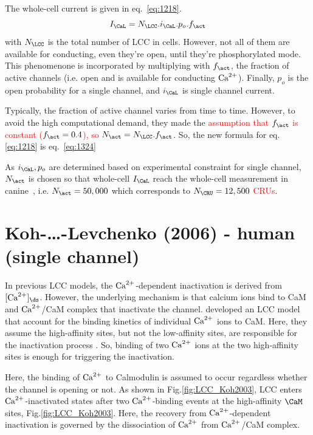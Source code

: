 The whole-cell current is given in eq.~\eqref{eq:1218}.
\begin{equation}
  \label{eq:1218}
  I_\CaL = N_\LCC . i_\CaL . p_o . f_\act
\end{equation}
with $N_\LCC$ is the total number of LCC in cells. However, not all of them are
available for conducting, even they're open, until they're phosphorylated
mode.
This phenomenone is incorporated by multiplying with $f_\act$, the fraction of
active channels (i.e. open and is available  for conducting ${\text{Ca}^{2+}}$). Finally,
$p_o$ is the open probability for a single channel, and $i_\CaL$ is single channel current.

Typically, the fraction of active channel varies from time to time. However, to
avoid the high computational demand, they made the \textcolor{red}{assumption
that $f_\act$ is constant ($f_\act=0.4$)\citep{handrock1998}, so
  $N_\act=N_\LCC.f_\act$}. So, the new formula for eq.\ref{eq:1218} is
eq.~\eqref{eq:1324}

As $i_\CaL,p_o$ are determined based on experimental constraint for single
channel, $N_\act$ is chosen so that whole-cell $I_\CaL$ reach the whole-cell
measurement in canine~\citep{hobai2001}, i.e. $N_\act=50,000$ which
corresponds to \textcolor{red}{$N_\CRU = 12,500$ CRUs}.





\section{Koh-\ldots-Levchenko (2006) - human (single channel)}
\label{sec:LCC_Koh2006}

In previous LCC models, the ${\text{Ca}^{2+}}$-dependent inactivation is derived from
$[\Ca]_\ds$. However, the underlying mechanism is that calcium ions bind to
CaM and ${\text{Ca}^{2+}}$/CaM complex that inactivate the channel. \citep{koh2006} developed
an LCC model that account for the binding kinetics of individual ${\text{Ca}^{2+}}$ ions to
CaM. Here, they assume the high-affinity sites, but not the low-affinity sites,
are responsible for the inactivation process \citep{peterson1999}. So, binding
of two ${\text{Ca}^{2+}}$ ions at the two high-affinity sites is enough for triggering the
inactivation.

Here, the binding of ${\text{Ca}^{2+}}$ to Calmodulin is assumed to occur regardless whether
the channel is opening or not. As shown in Fig.\ref{fig:LCC_Koh2003}, LCC enters
${\text{Ca}^{2+}}$-inactivated states after two ${\text{Ca}^{2+}}$-binding events at the high-affinity
$\CaM$ sites, Fig.\ref{fig:LCC_Koh2003}. Here, the recovery from ${\text{Ca}^{2+}}$-dependent
inactivation is governed by the dissociation of ${\text{Ca}^{2+}}$ from ${\text{Ca}^{2+}}$/CaM complex.

